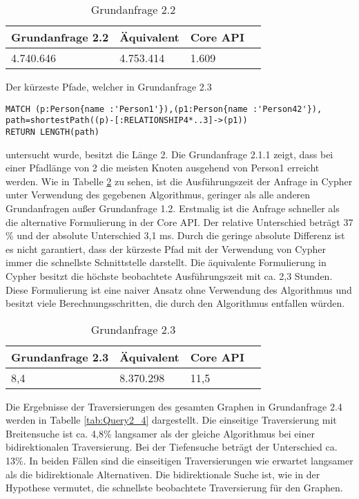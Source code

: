 \FloatBarrier
\begin{table}[h]
	\centering
		\begin{tabular}{ |p{3cm}|p{3cm}|p{3cm}|p{3cm}|  }
			\hline
			Grundanfrage 2.2 & Äquivalent&Core API\\
			\hline
			4.740.646    & 4.753.414 &  1.609\\
			\hline
		\end{tabular}
		\caption{Grundanfrage 2.2}
		\label{tab:Query2_2}
\end{table}
\FloatBarrier
\noindent Der kürzeste Pfade, welcher in Grundanfrage 2.3
\begin{Verbatim}[frame=single]
MATCH (p:Person{name :'Person1'}),(p1:Person{name :'Person42'}),
path=shortestPath((p)-[:RELATIONSHIP4*..3]->(p1)) 
RETURN LENGTH(path)
\end{Verbatim} 
 untersucht wurde, besitzt die Länge 2. Die Grundanfrage 2.1.1 zeigt, dass bei einer Pfadlänge von 2 die meisten Knoten ausgehend von Person1 erreicht werden. Wie in Tabelle \ref{tab:Query2_3} zu sehen, ist die Ausführungszeit der Anfrage in Cypher unter Verwendung des gegebenen Algorithmus, geringer als alle anderen Grundanfragen außer Grundanfrage 1.2. Erstmalig ist die Anfrage schneller als die alternative Formulierung in der Core API. Der relative Unterschied beträgt 37 \% und  der absolute Unterschied 3,1 ms. Durch die geringe absolute Differenz ist es nicht garantiert, dass der kürzeste Pfad mit der Verwendung von Cypher immer die schnellste Schnittstelle darstellt. \newline
Die äquivalente Formulierung in Cypher besitzt die höchste beobachtete Ausführungszeit mit ca. 2,3 Stunden. Diese Formulierung ist eine naiver Ansatz ohne Verwendung des Algorithmus und besitzt viele Berechnungsschritten, die durch den Algorithmus entfallen würden.
\FloatBarrier
\begin{table}[!htb]
	\centering
		\begin{tabular}{ |p{3cm}|p{3cm}|p{3cm}|p{3cm}|  }
			\hline
			Grundanfrage 2.3 & Äquivalent&Core API\\
			\hline
			8,4    & 8.370.298 &  11,5\\
			\hline
		\end{tabular}
		\caption{Grundanfrage 2.3}
		\label{tab:Query2_3}
\end{table}
\FloatBarrier
\noindent Die Ergebnisse der Traversierungen des gesamten Graphen in Grundanfrage 2.4 werden in Tabelle \ref{tab:Query2_4} dargestellt. Die einseitige Traversierung mit Breitensuche ist ca. 4,8\% langsamer als der gleiche Algorithmus bei einer bidirektionalen Traversierung. Bei der Tiefensuche beträgt der Unterschied ca. 13\%. In beiden Fällen sind die einseitigen Traversierungen wie erwartet langsamer als die bidirektionale Alternativen. Die bidirektionale Suche ist, wie in der Hypothese vermutet, die schnellste beobachtete Traversierung für den Graphen.  
